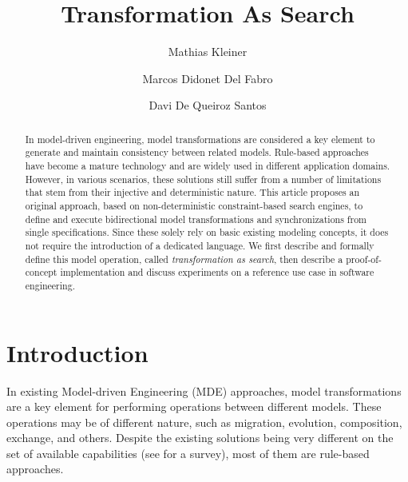 \documentclass{llncs}
\begin{document}
\title{Transformation As Search}
\author{Mathias Kleiner \and Marcos Didonet Del Fabro \and Davi De Queiroz Santos}


\maketitle

\begin{abstract}
In model-driven engineering, model transformations are considered a key element
to generate and maintain consistency between related models. Rule-based
approaches have become a mature technology and are widely used in different application
domains. However, in various scenarios, these solutions still suffer from a
number of limitations that stem from their injective and deterministic nature. This
article proposes an original approach, based on non-deterministic constraint-based search engines, 
to define and execute bidirectional model transformations and synchronizations from single specifications. Since these solely rely on basic existing modeling concepts, it does not require the introduction of a dedicated language. We first describe and formally define this model operation, called \emph{transformation as search}, then describe a proof-of-concept implementation and discuss experiments on a reference use case in software engineering.
\end{abstract}
%
\setcounter{tocdepth}{2}
%
\section{Introduction}

In existing Model-driven Engineering (MDE) approaches, model transformations are
a key element for performing operations between different models. These operations
may be of different nature, such as migration, evolution, composition, exchange,
and others. 
Despite the existing solutions being very different on the set of
available capabilities (see \cite{czarnecki} for a survey), most of them are rule-based approaches.
\end{document}
